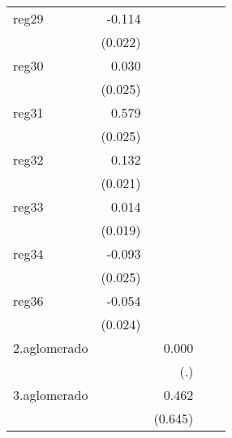 {\begin{longtable}{l*{4}{D{.}{.}{-1}}}
\addlinespace
reg29       &      -0.114\sym{***}&                     &                     &                     \\
            &     (0.022)         &                     &                     &                     \\
\addlinespace
reg30       &       0.030         &                     &                     &                     \\
            &     (0.025)         &                     &                     &                     \\
\addlinespace
reg31       &       0.579\sym{***}&                     &                     &                     \\
            &     (0.025)         &                     &                     &                     \\
\addlinespace
reg32       &       0.132\sym{***}&                     &                     &                     \\
            &     (0.021)         &                     &                     &                     \\
\addlinespace
reg33       &       0.014         &                     &                     &                     \\
            &     (0.019)         &                     &                     &                     \\
\addlinespace
reg34       &      -0.093\sym{***}&                     &                     &                     \\
            &     (0.025)         &                     &                     &                     \\
\addlinespace
reg36       &      -0.054\sym{*}  &                     &                     &                     \\
            &     (0.024)         &                     &                     &                     \\
\addlinespace
2.aglomerado&                     &       0.000         &                     &                     \\
            &                     &         (.)         &                     &                     \\
\addlinespace
3.aglomerado&                     &       0.462         &                     &                     \\
            &                     &     (0.645)         &                     &                     \\

\end{longtable}}
